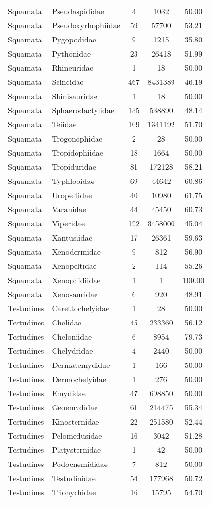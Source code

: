 \begin{longtable}{llccc}
  Squamata & Pseudaspididae &   4 & 1032 & 50.00 \\ 
  Squamata & Pseudoxyrhophiidae &  59 & 57700 & 53.21 \\ 
  Squamata & Pygopodidae &   9 & 1215 & 35.80 \\ 
  Squamata & Pythonidae &  23 & 26418 & 51.99 \\ 
  Squamata & Rhineuridae &   1 &  18 & 50.00 \\ 
  Squamata & Scincidae & 467 & 8431389 & 46.19 \\ 
  Squamata & Shinisauridae &   1 &  18 & 50.00 \\ 
  Squamata & Sphaerodactylidae & 135 & 538890 & 48.14 \\ 
  Squamata & Teiidae & 109 & 1341192 & 51.70 \\ 
  Squamata & Trogonophidae &   2 &  28 & 50.00 \\ 
  Squamata & Tropidophiidae &  18 & 1664 & 50.00 \\ 
  Squamata & Tropiduridae &  81 & 172128 & 58.21 \\ 
  Squamata & Typhlopidae &  69 & 44642 & 60.86 \\ 
  Squamata & Uropeltidae &  40 & 10980 & 61.75 \\ 
  Squamata & Varanidae &  44 & 45450 & 60.73 \\ 
  Squamata & Viperidae & 192 & 3458000 & 45.04 \\ 
  Squamata & Xantusiidae &  17 & 26361 & 59.63 \\ 
  Squamata & Xenodermidae &   9 & 812 & 56.90 \\ 
  Squamata & Xenopeltidae &   2 & 114 & 55.26 \\ 
  Squamata & Xenophidiidae &   1 &   1 & 100.00 \\ 
  Squamata & Xenosauridae &   6 & 920 & 48.91 \\ 
  Testudines & Carettochelyidae &   1 &  28 & 50.00 \\ 
  Testudines & Chelidae &  45 & 233360 & 56.12 \\ 
  Testudines & Cheloniidae &   6 & 8954 & 79.73 \\ 
  Testudines & Chelydridae &   4 & 2440 & 50.00 \\ 
  Testudines & Dermatemydidae &   1 & 166 & 50.00 \\ 
  Testudines & Dermochelyidae &   1 & 276 & 50.00 \\ 
  Testudines & Emydidae &  47 & 698850 & 50.00 \\ 
  Testudines & Geoemydidae &  61 & 214475 & 55.34 \\ 
  Testudines & Kinosternidae &  22 & 251580 & 52.44 \\ 
  Testudines & Pelomedusidae &  16 & 3042 & 51.28 \\ 
  Testudines & Platysternidae &   1 &  42 & 50.00 \\ 
  Testudines & Podocnemididae &   7 & 812 & 50.00 \\ 
  Testudines & Testudinidae &  54 & 177968 & 50.72 \\ 
  Testudines & Trionychidae &  16 & 15795 & 54.70 \\ 
   \hline
\hline
\label{table-family_reptiles}
\end{longtable}
